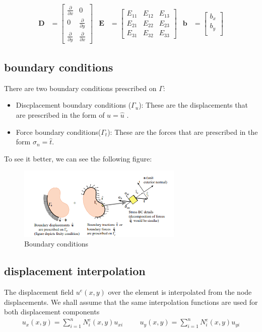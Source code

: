 \documentclass{article}  %
\begin{document}
\begin{align}
  \mathbf{D} &=
  \begin{bmatrix}
      \frac{\partial}{\partial x} & 0 \\
      0 & \frac{\partial}{\partial y} \\
      \frac{\partial}{\partial y} & \frac{\partial}{\partial x}
  \end{bmatrix}
  &
  \mathbf{E} &=
  \begin{bmatrix}
    E_{11} & E_{12} & E_{13} \\
    E_{21} & E_{22} & E_{23} \\
    E_{31} & E_{32} & E_{33}
  \end{bmatrix}
  &
  \mathbf{b} &=
  \begin{bmatrix}
      b_x \\
      b_y \\
  \end{bmatrix}
\end{align}

\subsection{boundary conditions}
There are two boundary conditions prescribed on $\Gamma$:
\begin{itemize}
    \item Discplacement boundary conditions ($\Gamma_u$): These are the displacements that are prescribed in the form of $u= \hat{u}$ .
    \item Force boundary conditions($\Gamma_t$): These are the forces that are prescribed in the form $\sigma_n= \hat{t}$.
\end{itemize}
To see it better, we can see the following figure:  
\begin{figure}[h]
    \centering
    \includegraphics[width=0.7\textwidth]{Graphics/boundary_c1.PNG}
    \caption{Boundary conditions}
    \label{fig:boundary_conditions}
\end{figure}

\subsection{displacement interpolation}
The displacement field $u^e(x, y)$ over the element is interpolated from the node displacements. We
shall assume that the same interpolation functions are used for both displacement components
\begin{align}
  u_x(x,y)= \sum_{i=1}^{n} N_i^e(x,y) u_{xi}
  \hspace{1cm}
  u_y(x,y)= \sum_{i=1}^{n} N_i^e(x,y) u_{yi}
\end{align}
\end{document}
